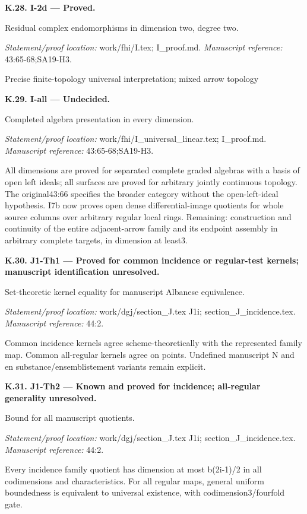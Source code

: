 \par\medskip\noindent\textbf{K.28. I-2d --- Proved.}\par
Residual complex endomorphisms in dimension two, degree two.
\par\emph{Statement/proof location:} work/fhi/I.tex; I\_proof.md.
\emph{Manuscript reference:} 43:65-68;SA19-H3.
\par Precise finite-topology universal interpretation; mixed arrow topology
\par\medskip\noindent\textbf{K.29. I-all --- Undecided.}\par
Completed algebra presentation in every dimension.
\par\emph{Statement/proof location:} work/fhi/I\_universal\_linear.tex; I\_proof.md.
\emph{Manuscript reference:} 43:65-68;SA19-H3.
\par All dimensions are proved for separated complete graded algebras with a basis of open left ideals; all surfaces are proved for arbitrary jointly continuous topology. The original43:66 specifies the broader category without the open-left-ideal hypothesis. I7b now proves open dense differential-image quotients for whole source columns over arbitrary regular local rings. Remaining: construction and continuity of the entire adjacent-arrow family and its endpoint assembly in arbitrary complete targets, in dimension at least3.
\par\medskip\noindent\textbf{K.30. J1-Th1 --- Proved for common incidence or regular-test kernels; manuscript identification unresolved.}\par
Set-theoretic kernel equality for manuscript Albanese equivalence.
\par\emph{Statement/proof location:} work/dgj/section\_J.tex J1i; section\_J\_incidence.tex.
\emph{Manuscript reference:} 44:2.
\par Common incidence kernels agree scheme-theoretically with the represented family map. Common all-regular kernels agree on points. Undefined manuscript N and en substance/ensemblistement variants remain explicit.
\par\medskip\noindent\textbf{K.31. J1-Th2 --- Known and proved for incidence; all-regular generality unresolved.}\par
Bound for all manuscript quotients.
\par\emph{Statement/proof location:} work/dgj/section\_J.tex J1i; section\_J\_incidence.tex.
\emph{Manuscript reference:} 44:2.
\par Every incidence family quotient has dimension at most b(2i-1)/2 in all codimensions and characteristics. For all regular maps, general uniform boundedness is equivalent to universal existence, with codimension3/fourfold gate.
